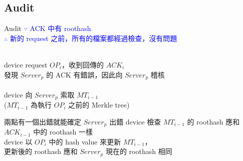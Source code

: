 \subsection{Audit}
\begin{frame}{Audit}
	\textcolor{blue}{$\because$ ACK 中有 roothash\\
	$\therefore$ 新的 request 之前，所有的檔案都經過檢查，沒有問題}\\
	~\\	
	\begin{block}{}
		\centering
		device request $OP_i$，收到回傳的 $ACK_i$\\
		發現 $Server_p$ 的 ACK 有錯誤，因此向 $Server_p$ 稽核\\
		~\\
		device 向 $Server_p$ 索取 $MT_{i-1}$\\
		($MT_{i-1}$ 為執行 $OP_i$ 之前的 Merkle tree)
	\end{block}
	\begin{alertblock}{ 兩點有一個出錯就能確定 $Server_p$ 出錯}
		 device 檢查 $MT_{i-1}$ 的 roothash 應和 $ACK_{i-1}$ 中的 roothash 一樣\\
		 device 以 $OP_i$ 中的 hash value 來更新 $MT_{i-1}$，\\
		\tab{}更新後的 roothash 應和 $Server_p$ 現在的 roothash 相同
	\end{alertblock}	
\end{frame}
